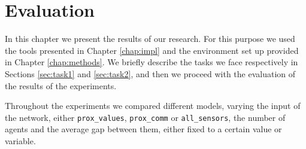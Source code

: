 \chapter{Evaluation}
\label{chap:experiments}

In this chapter we present the results of our research. 
For this purpose we used the tools presented in Chapter \ref{chap:impl} and the 
environment set up provided in Chapter \ref{chap:methods}.
We briefly describe the tasks we face respectively in Sections \ref{sec:task1} and 
\ref{sec:task2}, and then we proceed with the evaluation of the results of the 
experiments.

Throughout the experiments we compared different models, varying the input of 
the network, either \texttt{prox\_values}, \texttt{prox\_comm} or 
\texttt{all\_sensors}, the number of agents and the average gap between them, 
either fixed to a certain value or variable.



